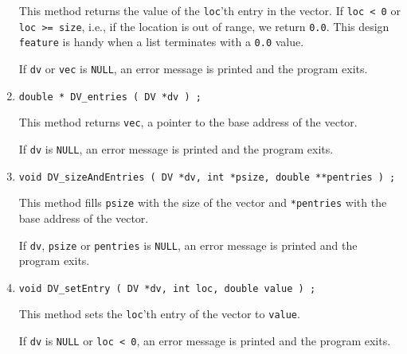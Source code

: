 \begin{enumerate}
\begin{verbatim}
\end{verbatim}
This method returns the value of the {\tt loc}'th entry
in the vector.
If {\tt loc < 0} or {\tt loc >= size}, i.e., if the location is
out of range, we return {\tt 0.0}.
This design {\tt feature} is handy when a list terminates with a
{\tt 0.0} value.
\par {}
If {\tt dv} or {\tt vec} is {\tt NULL},
an error message is printed and the program exits.
\item
\begin{verbatim}
double * DV_entries ( DV *dv ) ;
\end{verbatim}
This method returns {\tt vec},
a pointer to the base address of the vector.
\par {}
If {\tt dv} is {\tt NULL},
an error message is printed and the program exits.
\item
\begin{verbatim}
void DV_sizeAndEntries ( DV *dv, int *psize, double **pentries ) ;
\end{verbatim}
This method fills {\tt *psize} with the size of the vector
and {\tt **pentries} with the base address of the vector.
\par {}
If {\tt dv}, {\tt psize} or {\tt pentries} is {\tt NULL},
an error message is printed and the program exits.
\item
\begin{verbatim}
void DV_setEntry ( DV *dv, int loc, double value ) ;
\end{verbatim}
This method sets the {\tt loc}'th entry of the vector to {\tt value}.
\par {}
If {\tt dv} is {\tt NULL} or {\tt loc < 0},
an error message is printed and the program exits.
\end{enumerate}
\par
